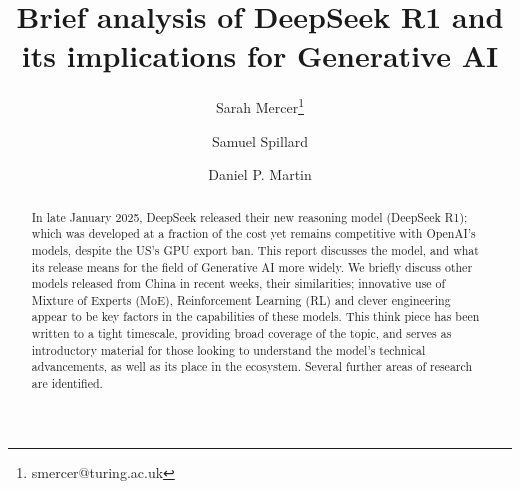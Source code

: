 \title{\textbf{Brief analysis of DeepSeek R1 and its implications for Generative AI}}

\date{\vspace{-5ex}}



\author[1]{Sarah Mercer\thanks{smercer@turing.ac.uk}}
\author[1]{Samuel Spillard}
\author[1]{Daniel P. Martin}


\maketitle
\begin{abstract}
   In late January 2025, DeepSeek released their new reasoning model (DeepSeek R1); which was developed at a fraction of the cost yet remains competitive with OpenAI's models, despite the US's GPU export ban. This report discusses the model, and what its release means for the field of Generative AI more widely.  We briefly discuss other models released from China in recent weeks, their similarities; innovative use of Mixture of Experts (MoE), Reinforcement Learning (RL) and clever engineering appear to be key factors in the capabilities of these models.  This think piece has been written to a tight timescale, providing broad coverage of the topic, and serves as introductory material for those looking to understand the model's technical advancements, as well as its place in the ecosystem.  Several further areas of research are identified.
\end{abstract}
\vspace{10mm} 

